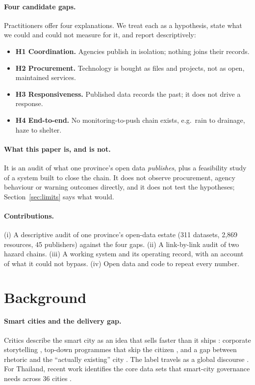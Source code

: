 \documentclass[10pt,twocolumn,a4paper]{article}
\newcommand{\hyp}[1]{\textbf{\color{sigred}#1}}
\begin{document}
\paragraph{Four candidate gaps.} Practitioners offer four explanations. We treat each as a hypothesis, state what we could and could not measure for it, and report descriptively:
\begin{itemize}
\item \hyp{H1 Coordination.} Agencies publish in isolation; nothing joins their records.
\item \hyp{H2 Procurement.} Technology is bought as files and projects, not as open, maintained services.
\item \hyp{H3 Responsiveness.} Published data records the past; it does not drive a response.
\item \hyp{H4 End-to-end.} No monitoring-to-push chain exists, e.g.\ rain to drainage, haze to shelter.
\end{itemize}
\paragraph{What this paper is, and is not.} It is an audit of what one province's open data \emph{publishes}, plus a feasibility study of a system built to close the chain. It does not observe procurement, agency behaviour or warning outcomes directly, and it does not test the hypotheses; Section~\ref{sec:limits} says what would.
\paragraph{Contributions.} (i) A descriptive audit of one province's open-data estate (311 datasets, 2{,}869 resources, 45 publishers) against the four gaps. (ii) A link-by-link audit of two hazard chains. (iii) A working system and its operating record, with an account of what it could not bypass. (iv) Open data and code to repeat every number.

\section{Background}
\paragraph{Smart cities and the delivery gap.}
Critics describe the smart city as an idea that sells faster than it ships \citep{hollands2008,townsend2013smart,greenfield2013against}: corporate storytelling \citep{soderstrom2014,wiig2015}, top-down programmes that skip the citizen \citep{datta2015,cardullo2019}, and a gap between rhetoric and the ``actually existing'' city \citep{shelton2015}. The label travels as a global discourse \citep{joss2019}. For Thailand, recent work identifies the core data sets that smart-city governance needs across 36 cities \citep{ruangwicha2026}.
\end{document}
